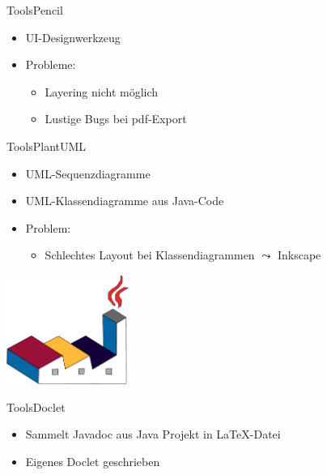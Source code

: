 \documentclass[10pt]{beamer}
\begin{document}
\begin{frame}{Tools}{Pencil}
	\begin{itemize}
		\item UI-Designwerkzeug
		\item Probleme:
			\begin{itemize}
				\item Layering nicht möglich
				\item Lustige Bugs bei pdf-Export
			\end{itemize} 
	\end{itemize}
\end{frame}

\begin{frame}[t]{Tools}{PlantUML}
	\begin{itemize}
		\item UML-Sequenzdiagramme
		\item UML-Klassendiagramme aus Java-Code
		\item Problem: 
			\begin{itemize}
				\item Schlechtes Layout bei Klassendiagrammen $\leadsto$ Inkscape
			\end{itemize}
	\end{itemize}
	\vspace{2cm}
    \hfill\includegraphics[width = 0.3\textwidth]{img/plantuml-cropped}
\end{frame}

\begin{frame}{Tools}{Doclet}
	\begin{itemize}
		\item Sammelt Javadoc aus Java Projekt in \LaTeX{}-Datei
		\item Eigenes Doclet geschrieben
	\end{itemize}
\end{frame}
\end{document}
